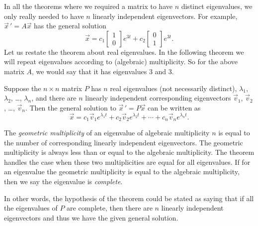 \documentclass[12pt]{book}
\begin{document}
In all the
theorems where we required a matrix to have $n$ distinct eigenvalues, we only
really needed to have $n$ linearly independent eigenvectors.  For example,
${\vec{x}\,}' = A\vec{x}$ has the general solution
\begin{equation*}
\vec{x} = 
c_1 \begin{bmatrix} 1 \\ 0 \end{bmatrix} e^{3t}
+ c_2 \begin{bmatrix} 0 \\ 1 \end{bmatrix} e^{3t} .
\end{equation*}
Let us restate the theorem about real eigenvalues.  In the following theorem
we will repeat eigenvalues according to (algebraic) multiplicity.  So
for the above matrix $A$, we would say that it has eigenvalues 3 and 3.

\begin{theorem}
Suppose the $n \times n$ matrix $P$ 
has $n$ real eigenvalues (not necessarily distinct), $\lambda_1$,
$\lambda_2$, \ldots, $\lambda_n$,
and there are $n$ linearly independent corresponding eigenvectors
$\vec{v}_1$, $\vec{v}_2$, \ldots, $\vec{v}_n$.  Then the general solution to 
${\vec{x}\,}' = P\vec{x}$
can be written as
\begin{equation*}
\vec{x} = c_1 \vec{v}_1 e^{\lambda_1 t} +
c_2 \vec{v}_2 e^{\lambda_2 t} + \cdots +
c_n \vec{v}_n e^{\lambda_n t} .
\end{equation*}
\end{theorem}

The \emph{geometric multiplicity} of an eigenvalue of algebraic multiplicity $n$
is equal to the number of corresponding linearly independent eigenvectors.
The geometric multiplicity is always less than or
equal to the algebraic multiplicity.  The theorem handles the case
when these two multiplicities are equal for all eigenvalues.
If for an eigenvalue the geometric multiplicity is equal
to the algebraic multiplicity, then we say the eigenvalue is
\emph{complete}.

In other words, 
the hypothesis of the theorem could be stated as saying that if all
the eigenvalues of $P$ are complete, then there are $n$ linearly independent
eigenvectors and thus we have the given general solution.

\medskip
\end{document}
